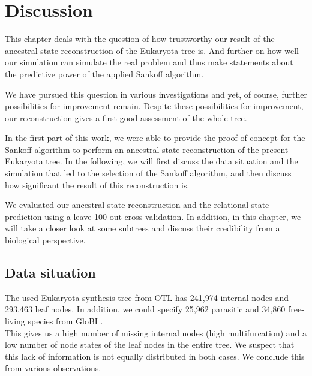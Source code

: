 \chapter{Discussion}
  This chapter deals with the question of how trustworthy our result of the ancestral state 
    reconstruction of the Eukaryota tree is. And further on how well our simulation can simulate the 
    real problem and thus make statements about the predictive power of the applied Sankoff algorithm.

  We have pursued this question in various investigations and yet, of course, further possibilities 
    for improvement remain. Despite these possibilities for improvement, our reconstruction gives a 
    first good assessment of the whole tree.

  In the first part of this work, we were able to provide the proof of concept for the Sankoff 
    algorithm to perform an ancestral state reconstruction of the present Eukaryota tree. In the 
    following, we will first discuss the data situation and the simulation that led to the selection 
    of the Sankoff algorithm, and then discuss how significant the result of this reconstruction is.

  We evaluated our ancestral state reconstruction and the relational state prediction using a 
    leave-100-out cross-validation. In addition, in this chapter, we will take a closer look at some 
    subtrees and discuss their credibility from a biological perspective.

  \section{Data situation} \label{sec:discussion - data situation}
    The used Eukaryota synthesis tree from OTL \cite{Hinchliff2015} has 241,974 internal nodes and 
      293,463 leaf nodes. In addition, we could specify 25,962 parasitic and 34,860 free-living 
      species from GloBI \cite{Poelen2014}. \\
    This gives us a high number of missing internal nodes (high multifurcation) and a low number of 
      node states of the leaf nodes in the entire tree.
    We suspect that this lack of information is not equally distributed in both cases. We conclude 
      this from various observations.

